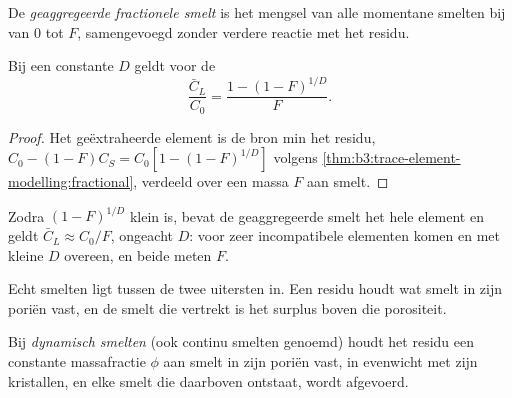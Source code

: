 \begin{omfigure}
\par{}\label{fig:b3:trace-element-modelling:curves}
\end{omfigure}

\begin{definition}\label{def:b3:trace-element-modelling:fractional}
De \emph{geaggregeerde fractionele smelt} is het
mengsel van alle momentane smelten bij  van $0$ tot
$F$, samengevoegd zonder verdere reactie met het residu.
\end{definition}

\begin{proposition}
\label{prop:b3:trace-element-modelling:aggregate}
Bij een constante $D$ geldt voor de 
\[
\frac{\bar C_L}{C_0} = \frac{1 - (1 - F)^{1/D}}{F}.
\]
\end{proposition}

\begin{proof}
Het geëxtraheerde element is de bron min het residu,
$C_0 - (1 - F)C_S = C_0[1 - (1 - F)^{1/D}]$ volgens \cref{thm:b3:trace-element-modelling:fractional},
verdeeld over een massa $F$ aan smelt.
\end{proof}

Zodra $(1 - F)^{1/D}$ klein is, bevat de geaggregeerde smelt het hele
element en geldt $\bar C_L \approx C_0/F$, ongeacht $D$: voor zeer incompatibele
elementen komen  en  met kleine $D$ overeen, en
beide meten $F$.

Echt smelten ligt tussen de twee uitersten in. Een residu houdt wat smelt in
zijn poriën vast, en de smelt die vertrekt is het surplus boven die porositeit.

\begin{definition}\label{def:b3:trace-element-modelling:dynamic}
Bij \emph{dynamisch smelten} (ook continu smelten
genoemd) houdt het residu een constante massafractie $\phi$ aan smelt in zijn
poriën vast, in evenwicht met zijn kristallen, en elke smelt die daarboven ontstaat,
wordt afgevoerd.
\end{definition}

